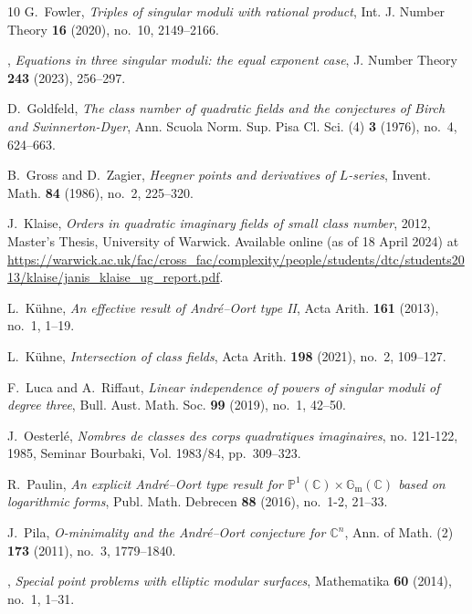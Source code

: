 \documentclass[11pt,a4paper, british]{amsart}
\theoremstyle{definition}
\theoremstyle{remark}
\numberwithin{equation}{section}
\begin{document}
\begin{thebibliography}{10}
		G.~Fowler, \emph{Triples of singular moduli with rational product}, Int. J.
		Number Theory \textbf{16} (2020), no.~10, 2149--2166.
		
		\bysame, \emph{Equations in three singular moduli: the equal exponent case}, J.
		Number Theory \textbf{243} (2023), 256--297.
		
		D.~Goldfeld, \emph{The class number of quadratic fields and the conjectures of
			{B}irch and {S}winnerton-{D}yer}, Ann. Scuola Norm. Sup. Pisa Cl. Sci. (4)
		\textbf{3} (1976), no.~4, 624--663.
		
		B.~Gross and D.~Zagier, \emph{Heegner points and derivatives of {$L$}-series},
		Invent. Math. \textbf{84} (1986), no.~2, 225--320.
		
		J.~Klaise, \emph{Orders in quadratic imaginary fields of small class number},
		2012, Master's Thesis, University of Warwick. Available online (as of 18
		April 2024) at
		\url{https://warwick.ac.uk/fac/cross_fac/complexity/people/students/dtc/students2013/klaise/janis_klaise_ug_report.pdf}.
		
		L.~K{\"{u}}hne, \emph{An effective result of {A}ndr\'{e}--{O}ort type {II}},
		Acta Arith. \textbf{161} (2013), no.~1, 1--19.
		
		L.~K\"{u}hne, \emph{Intersection of class fields}, Acta Arith. \textbf{198}
		(2021), no.~2, 109--127.
		
		F.~Luca and A.~Riffaut, \emph{Linear independence of powers of singular moduli
			of degree three}, Bull. Aust. Math. Soc. \textbf{99} (2019), no.~1, 42--50.
		
		J.~Oesterl\'e, \emph{Nombres de classes des corps quadratiques imaginaires},
		no. 121-122, 1985, Seminar Bourbaki, Vol. 1983/84, pp.~309--323.
		
		R.~Paulin, \emph{An explicit {A}ndr\'{e}--{O}ort type result for
			{$\mathbb{P}^1(\mathbb{C})\times \mathbb{G}_\mathrm{m}(\mathbb{C})$} based on
			logarithmic forms}, Publ. Math. Debrecen \textbf{88} (2016), no.~1-2, 21--33.
		
		J.~Pila, \emph{O-minimality and the {A}ndr\'e--{O}ort conjecture for {$\mathbb{
					C}^n$}}, Ann. of Math. (2) \textbf{173} (2011), no.~3, 1779--1840.
		
		\bysame, \emph{Special point problems with elliptic modular surfaces},
		Mathematika \textbf{60} (2014), no.~1, 1--31.
		

\end{thebibliography}
\end{document}
